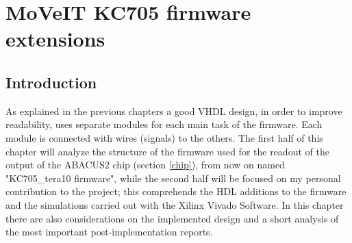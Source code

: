 \chapter{MoVeIT KC705 firmware extensions}
\section{Introduction}
\noindent As explained in the previous chapters a good VHDL design, in order to improve readability, uses separate modules for each main task of the firmware. Each module is connected with wires (signals) to the others. The first half of this chapter will analyze the structure of the firmware used for the readout of the output of the ABACUS2 chip (section \ref{chip}), from now on named "KC705\_tera10 firmware", while the second half will be focused on my personal contribution to the project; this comprehends the HDL additions to the firmware and the simulations carried out with the Xilinx Vivado Software.
In this chapter there are also considerations on the implemented design and a short analysis of the most important post-implementation reports. 


